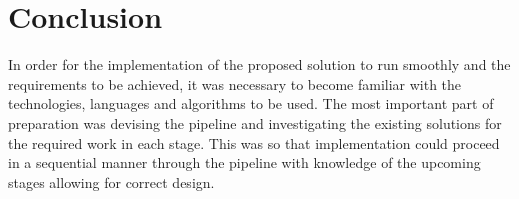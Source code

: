 \section{Conclusion}

In order for the implementation of the proposed solution to run smoothly and the requirements to be achieved, it was necessary to become familiar with the technologies, languages and algorithms to be used. The most important part of preparation was devising the pipeline and investigating the existing solutions for the required work in each stage. This was so that implementation could proceed in a sequential manner through the pipeline with knowledge of the upcoming stages allowing for correct design.